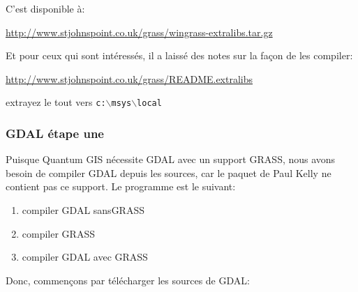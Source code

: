 C'est disponible à:

\url{http://www.stjohnspoint.co.uk/grass/wingrass-extralibs.tar.gz}

Et pour ceux qui sont intéressés, il a laissé des notes sur la façon de les compiler:

\url{http://www.stjohnspoint.co.uk/grass/README.extralibs}

extrayez le tout vers \texttt{c:$\backslash$msys$\backslash$local}

% 
% 
% 
% 
% 

\subsubsection{GDAL étape une}
Puisque Quantum GIS nécessite GDAL avec un support GRASS, nous avons besoin de compiler GDAL depuis les sources, car le paquet de Paul Kelly ne contient pas ce support.
Le programme est le suivant:

\begin{enumerate}
\item compiler GDAL sansGRASS
\item compiler GRASS
\item compiler GDAL avec GRASS
\end{enumerate}

Donc, commençons par télécharger les sources de GDAL:

